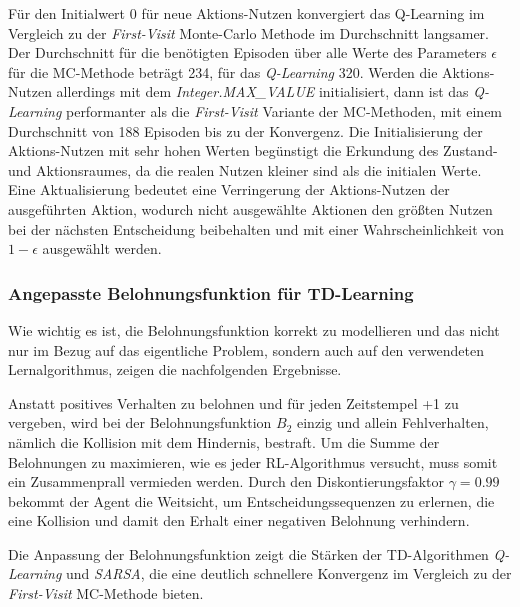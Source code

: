 Für den Initialwert 0 für neue Aktions-Nutzen konvergiert das Q-Learning im Vergleich zu der \textit{First-Visit} Monte-Carlo Methode im Durchschnitt langsamer. Der Durchschnitt für die benötigten Episoden über alle Werte des Parameters $\epsilon$ für die MC-Methode beträgt 234, für das \textit{Q-Learning} 320. Werden die Aktions-Nutzen allerdings mit dem \textit{Integer.MAX\_VALUE} initialisiert, dann ist das \textit{Q-Learning} performanter als die \textit{First-Visit} Variante der MC-Methoden, mit einem Durchschnitt von 188 Episoden bis zu der Konvergenz. Die Initialisierung der Aktions-Nutzen mit sehr hohen Werten begünstigt die Erkundung des Zustand- und Aktionsraumes, da die realen Nutzen kleiner sind als die initialen Werte. Eine Aktualisierung bedeutet eine Verringerung der Aktions-Nutzen der ausgeführten Aktion, wodurch nicht ausgewählte Aktionen den größten Nutzen bei der nächsten Entscheidung beibehalten und mit einer Wahrscheinlichkeit von $1-\epsilon$ ausgewählt werden.
\par 

\subsubsection*{Angepasste Belohnungsfunktion für TD-Learning}
Wie wichtig es ist, die Belohnungsfunktion korrekt zu modellieren und das nicht nur im Bezug auf das eigentliche Problem, sondern auch auf den verwendeten Lernalgorithmus, zeigen die nachfolgenden Ergebnisse.
\par 
Anstatt positives Verhalten zu belohnen und für jeden Zeitstempel +1 zu vergeben, wird bei der Belohnungsfunktion $B_2$ einzig und allein Fehlverhalten, nämlich die Kollision mit dem Hindernis, bestraft. Um die Summe der Belohnungen zu maximieren, wie es jeder RL-Algorithmus versucht, muss somit ein Zusammenprall vermieden werden. Durch den Diskontierungsfaktor $\gamma = 0.99$ bekommt der Agent die \glqq Weitsicht\grqq{}, um Entscheidungssequenzen zu erlernen, die eine Kollision und damit den Erhalt einer negativen Belohnung verhindern. 
\par 
Die Anpassung der Belohnungsfunktion zeigt die Stärken der TD-Algorithmen \textit{Q-Learning} und \textit{SARSA}, die eine deutlich schnellere Konvergenz im Vergleich zu der \textit{First-Visit} MC-Methode bieten.


